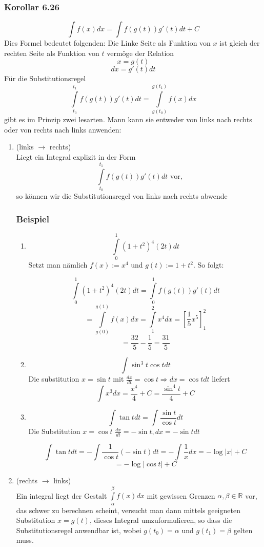 \subsubsection*{Korollar 6.26}
\[\int {f(x)dx = \int {f\left( {g(t)} \right)} g'(t)dt + C} \]
Dies Formel bedeutet folgenden: Die Linke Seite als Funktion von $x$ ist gleich der rechten Seite als Funktion von $t$ vermöge der Relation $$x=g(t)$$$$dx=g'(t)dt$$
Für die Substitutionsregel 
\[\int\limits_{{t_0}}^{{t_1}} {f\left( {g(t)} \right)g'(t)dt = \int\limits_{g({t_0})}^{g({t_1})} {f(x)dx} } \]
gibt es im Prinzip zwei lesarten.
\noindent Mann kann sie entweder von links nach rechts oder von rechts nach links anwenden: 
\begin{enumerate}
\item (links $\rightarrow$ rechts)\\
Liegt ein Integral explizit in der Form \[\int\limits_{{t_0}}^{{t_1}} {f\left( {g(t)} \right)g'(t)dt} \text{ vor,}\] so können wir die Substitutionsregel von links nach rechts abwende
\subsubsection*{Beispiel}
\begin{enumerate}
\item \[\int\limits_0^1 {{{(1 + {t^2})}^4}(2t)dt} \] Setzt man nämlich $f(x):=x^4$ und $g(t):=1+t^2$. So folgt:

\[\int\limits_0^1 {{{(1 + {t^2})}^4}(2t)dt}  = \int\limits_0^1 {f\left( {g(t)} \right)g'(t)dt} \]
\[ = \int\limits_{g(0)}^{g(1)} {f(x)dx = } \int\limits_1^2 {{x^4}dx = \left[ {\frac{1}{5}{x^5}} \right]_1^2} \]
\[ = \frac{{32}}{5} - \frac{1}{5} = \frac{{31}}{5}\]



\item \[\int {{{\sin }^3}t\cos t dt} \] Die substitution $x=\sin t$ mit $\frac{dx}{dt}=\cos t \Rightarrow dx=\cos t dt$ liefert \[\int {{x^3}dx = \frac{{{x^4}}}{4} + C = \frac{{{{\sin }^4}t}}{4}}  + C\]
\item \[\int {\tan tdt = \int {\frac{{\sin t}}{{\cos t}}dt} } \] Die Substitution $x=\cos t$ $\frac{dx}{dt}=-\sin t, dx=-\sin t dt$ 

\[\int {\tan tdt =  - \int {\frac{1}{{\cos t}}( - \sin t)dt =  - \int {\frac{1}{x}} } } dx =  - \log \left| x \right| + C\]
\[ =  - \log \left| {\cos t} \right| + C\]

\end{enumerate}
\item (rechts $\rightarrow$ links)\\
Ein integral liegt der Gestalt $\int\limits_\alpha ^\beta  {f(x)dx}$ mit gewissen Grenzen $\alpha,\beta\in\mathbb{R}$ vor, das schwer zu berechnen scheint, versucht man dann mittels geeigneten Substitution $x=g(t)$, dieses Integral umzuformulieren, so dass die Substitutionsregel anwendbar ist, wobei $g(t_0)=\alpha$ und $g(t_1)=\beta$ gelten muss. 

\end{enumerate}
